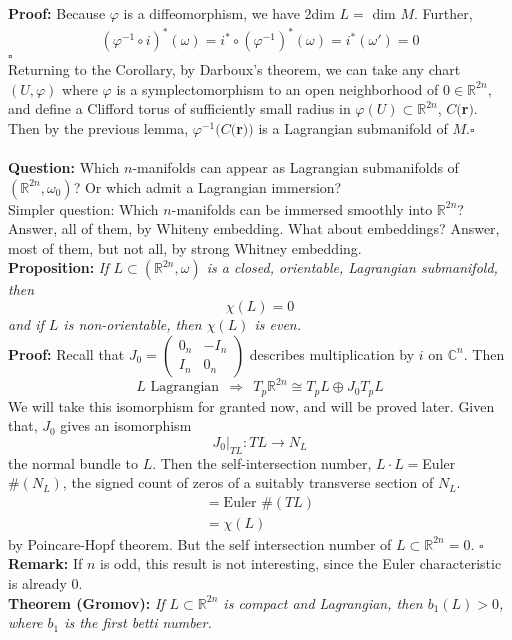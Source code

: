 \documentclass[12pt]{report}
\theoremstyle{definition}
\theoremstyle{remark}
\numberwithin{equation}{section}
\theoremstyle{definition}
\newcommand{\inv}[1]{#1^{-1}}
\newcommand{\bb}[1]{\mathbb{#1}}
\newcommand{\mqed}{\hfill\newline\null \hfill$\square$\\ }
\begin{document}
\textbf{Proof: }Because $\varphi$ is a diffeomorphism, we have 2dim $L = $ dim $M$. Further,
\begin{gather*}
	(\inv \varphi \circ i)^*(\omega) = i^* \circ (\inv \varphi)^*(\omega) = i^*(\omega') = 0
\end{gather*}
\mqed
Returning to the Corollary, by Darboux's theorem, we can take any chart $(U,\varphi)$ where $\varphi$ is a symplectomorphism to an open neighborhood of $0 \in \bb R^{2n}$, and define a Clifford torus of sufficiently small radius in $\varphi(U) \subset \bb R^{2n}$, $C($\textbf{r}$)$. Then by the previous lemma, $\inv \varphi (C($\textbf{r}$))$ is a Lagrangian submanifold of $M$.\mqed\\
\textbf{Question: }Which $n$-manifolds can appear as Lagrangian submanifolds of $(\bb R^{2n},\omega_0)$? Or which admit a Lagrangian immersion? \\
Simpler question: Which $n$-manifolds can be immersed smoothly into $\bb R^{2n}$? Answer, all of them, by Whiteny embedding. What about embeddings? Answer, most of them, but not all, by strong Whitney embedding. \\
\textbf{Proposition: }\textit{If $L \subset (\bb R^{2n}, \omega)$ is a closed, orientable, Lagrangian submanifold, then }
$$
\chi(L) = 0 
$$
\textit{and if $L$ is non-orientable, then $\chi(L)$ is even.}\\
\textbf{Proof: }Recall that $J_0 = \begin{pmatrix} 0_n & -I_n \\ I_n & 0_n \end{pmatrix}$ describes multiplication by $i$ on $\bb C^n$. Then
$$
	L \text{ Lagrangian}\ \  \Rightarrow \ \ T_p \bb R^{2n} \cong T_p L \oplus J_0 T_p L
$$
We will take this isomorphism for granted now, and will be proved later. Given that, $J_0$ gives an isomorphism
$$
	J_0|_{TL}:TL \to N_L 
$$
the normal bundle to $L$. Then the self-intersection number, $L \cdot L = $Euler $\#(N_L)$, the signed count of zeros of a suitably transverse section of $N_L$. 
\begin{gather*}
	= \text{Euler }\#(TL) \\
	= \chi(L)
\end{gather*}
by Poincare-Hopf theorem. But the self intersection number of $L \subset \bb R^{2n} = 0$. \mqed 
\textbf{Remark: }If $n$ is odd, this result is not interesting, since the Euler characteristic is already 0. \\
\textbf{Theorem (Gromov): }\textit{If $L \subset \bb R^{2n}$ is compact and Lagrangian, then $b_1(L) > 0$, where $b_1$ is the first betti number.}\\
\end{document}
